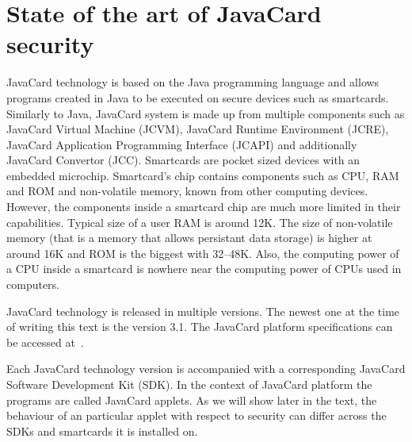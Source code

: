 \documentclass{../llncs/llncs}
\begin{document}
\section{State of the art of JavaCard security\label{sec:state-of-the-art}}
JavaCard technology is based on the Java programming language and allows programs created in Java to be executed on secure devices such as smartcards. Similarly to Java, JavaCard system is made up from multiple components such as JavaCard Virtual Machine (JCVM), JavaCard Runtime Environment (JCRE), JavaCard Application Programming Interface (JCAPI) and additionally JavaCard Convertor (JCC).  Smartcards are pocket sized devices with an embedded microchip. Smartcard's chip contains components such as CPU, RAM and ROM and non-volatile memory, known from other computing devices. However, the components inside a smartcard chip are much more limited in their capabilities. Typical size of a user RAM is around 12K. The size of non-volatile memory (that is a memory that allows persistant data storage) is higher at around 16K and ROM is the biggest with 32--48K. Also, the computing power of a CPU inside a smartcard is nowhere near the computing power of CPUs used in computers.

JavaCard technology is released in multiple versions. The newest one at the time of writing this text is the version 3.1. The JavaCard platform specifications can be accessed at~\cite{jcspecs31download}.


Each JavaCard technology version is accompanied with a corresponding JavaCard Software Development Kit (SDK).
In the context of JavaCard platform the programs are called JavaCard applets. As we will show later in the text, the behaviour of an particular applet with respect to security can differ across the SDKs and smartcards it is installed on.
\end{document}
